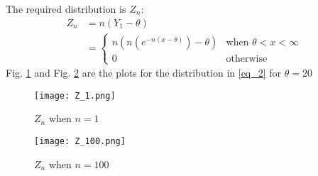 \documentclass[journal,12pt,twocolumn]{IEEEtran}
\theoremstyle{remark}
\numberwithin{equation}{subsection}
\begin{document}
The required distribution is $Z_n$:
\begin{align}
    Z_n &= n(Y_1 - \theta)\\
    &=\label{eq_2}
    \begin{cases}
    n(n(e^{-n(x-\theta)})-\theta)&\text{when }\theta<x<\infty\\
    0 &\text{otherwise}
    \end{cases}
\end{align}
Fig. \ref{fig:fig_3} and Fig. \ref{fig:fig_4} are the plots for the distribution in \eqref{eq_2} for $\theta=20$
\begin{figure}[h]
    \centering
    \texttt{[image: Z\_1.png]}
    \caption{$Z_n$ when $n=1$}
    \label{fig:fig_3}
\end{figure}
\begin{figure}[h]
    \centering
    \texttt{[image: Z\_100.png]}
    \caption{$Z_n$ when $n=100$}
    \label{fig:fig_4}
\end{figure}
\end{document}
